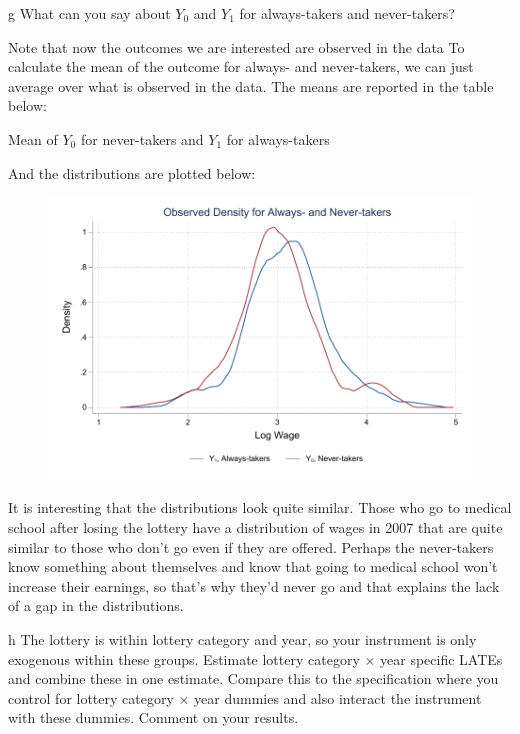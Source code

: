 \documentclass{article}
\begin{document}
\begin{problem}{g}
What can you say about $Y_{0}$ and $Y_{1}$ for always-takers and never-takers?
\end{problem}
\begin{solution}
Note that now the outcomes we are interested are observed in the data To calculate the mean of the outcome for always- and never-takers, we can just average over what is observed in the data. The means are reported in the table below:
\begin{table}[H]
    \centering
    
    \caption{Mean of $Y_0$ for never-takers and $Y_1$ for always-takers}
\end{table}

And the distributions are plotted below:
\begin{figure}[H]
    \centering
    \includegraphics[width=0.5*\textwidth]{ps3/figures/q4_partF_observed.pdf}
\end{figure}

It is interesting that the distributions look quite similar. Those who go to medical school after losing the lottery have a distribution of wages in 2007 that are quite similar to those who don't go even if they are offered. Perhaps the never-takers know something about themselves and know that going to medical school won't increase their earnings, so that's why they'd never go and that explains the lack of a gap in the distributions.
\end{solution}

\begin{problem}{h}
The lottery is within lottery category and year, so your instrument is only exogenous within these groups. Estimate lottery category $\times$ year specific LATEs and combine these in one estimate. Compare this to the specification where you control for lottery category $\times$ year dummies and also interact the instrument with these dummies. Comment on your results.
\end{problem}
\begin{solution}






\end{solution}
\end{document}
